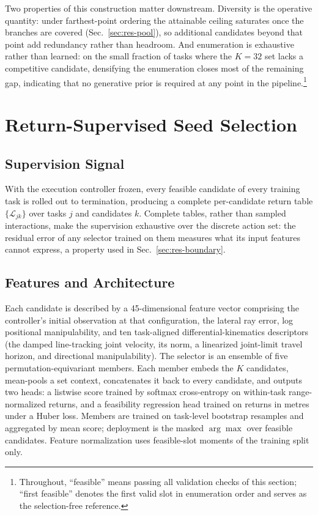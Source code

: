\documentclass[journal]{IEEEtran}
\begin{document}
Two properties of this construction matter downstream. Diversity is the
operative quantity: under farthest-point ordering the attainable ceiling
saturates once the branches are covered
(Sec.~\ref{sec:res-pool}), so additional candidates beyond that point add
redundancy rather than headroom. And enumeration is exhaustive rather
than learned: on the small fraction of tasks where the $K{=}32$ set lacks
a competitive candidate, densifying the enumeration closes most of the
remaining gap, indicating that no generative prior is required at any
point in the pipeline.\footnote{Throughout, ``feasible'' means passing all validation
checks of this section; ``first feasible'' denotes the first valid slot
in enumeration order and serves as the selection-free reference.}

\section{Return-Supervised Seed Selection}
\label{sec:selector}

\subsection{Supervision Signal}
With the execution controller frozen, every feasible candidate of every
training task is rolled out to termination, producing a complete
per-candidate return table $\{\mathcal{L}_{jk}\}$ over tasks $j$ and
candidates $k$. Complete tables, rather than sampled interactions, make
the supervision exhaustive over the discrete action set: the residual
error of any selector trained on them measures what its input features
cannot express, a property used in Sec.~\ref{sec:res-boundary}.

\subsection{Features and Architecture}
Each candidate is described by a 45-dimensional feature vector comprising
the controller's initial observation at that configuration, the lateral
ray error, log positional manipulability, and ten task-aligned
differential-kinematics descriptors (the damped line-tracking joint
velocity, its norm, a linearized joint-limit travel horizon, and
directional manipulability). The selector is an ensemble of five
permutation-equivariant members. Each member embeds the $K$ candidates,
mean-pools a set context, concatenates it back to every candidate, and
outputs two heads: a listwise score trained by softmax cross-entropy on
within-task range-normalized returns, and a feasibility regression head
trained on returns in metres under a Huber loss. Members are trained on
task-level bootstrap resamples and aggregated by mean score; deployment
is the masked $\arg\max$ over feasible candidates. Feature normalization
uses feasible-slot moments of the training split only.
\end{document}
